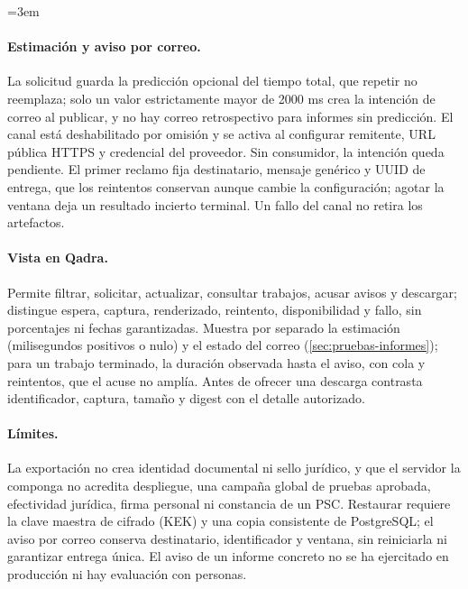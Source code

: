 {\emergencystretch=3em\paragraph{Estimación y aviso por correo.} La solicitud guarda la predicción
opcional del tiempo total, que repetir no reemplaza; solo un valor
estrictamente mayor de 2000 ms crea la intención de correo al publicar, y no hay
correo retrospectivo para informes sin predicción. El canal está deshabilitado
por omisión y se activa al configurar remitente, URL pública HTTPS y credencial
del proveedor. Sin consumidor, la intención queda pendiente. El primer
reclamo fija destinatario, mensaje genérico y UUID de entrega, que los
reintentos conservan aunque cambie la configuración; agotar la ventana deja un
resultado incierto terminal. Un fallo del canal no retira los artefactos.\par}

\paragraph{Vista en Qadra.} Permite filtrar, solicitar, actualizar, consultar
trabajos, acusar avisos y descargar; distingue espera, captura, renderizado,
reintento, disponibilidad y fallo, sin porcentajes ni fechas garantizadas.
Muestra por separado la estimación (milisegundos positivos o nulo) y el estado
del correo (\cref{sec:pruebas-informes}); para un trabajo terminado, la
duración observada hasta el aviso, con cola y reintentos, que el acuse no
amplía. Antes de ofrecer una descarga contrasta identificador, captura, tamaño
y digest con el detalle autorizado.

{\sloppy\paragraph{Límites.} La exportación no crea identidad documental ni
sello jurídico, y que el servidor la componga no acredita despliegue, una
campaña global de pruebas aprobada, efectividad jurídica, firma personal ni
constancia de un PSC. Restaurar requiere la clave maestra de cifrado (KEK) y una
copia consistente de PostgreSQL; el aviso por correo conserva destinatario,
identificador y ventana, sin reiniciarla ni garantizar entrega única. El aviso de un informe concreto no se ha ejercitado en producción ni hay
evaluación con personas.\par}


